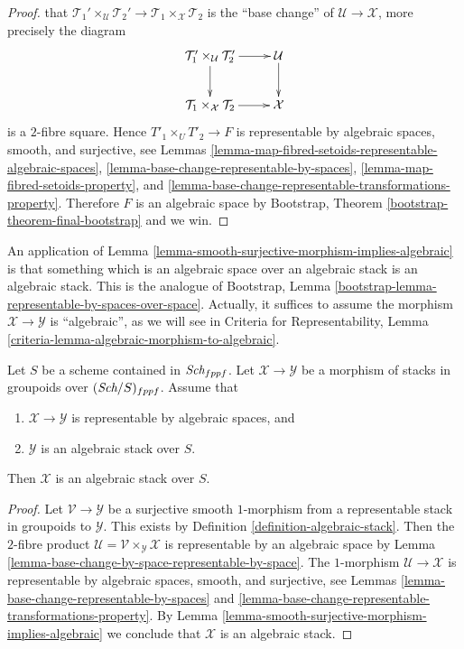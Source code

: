 \begin{proof}
that $\mathcal{T}_1' \times_\mathcal{U} \mathcal{T}_2' \to 
\mathcal{T}_1 \times_{\mathcal X} \mathcal{T}_2$
is the ``base change'' of $\mathcal{U} \to \mathcal{X}$, more precisely
the diagram
$$
\xymatrix{
\mathcal{T}_1' \times_\mathcal{U} \mathcal{T}_2' \ar[d] \ar[r] &
\mathcal{U} \ar[d] \\
\mathcal{T}_1 \times_{\mathcal X} \mathcal{T}_2 \ar[r] &
\mathcal{X}
}
$$
is a $2$-fibre square.
Hence $T'_1 \times_U T'_2 \to F$ is representable by algebraic spaces,
smooth, and surjective, see
Lemmas \ref{lemma-map-fibred-setoids-representable-algebraic-spaces},
\ref{lemma-base-change-representable-by-spaces},
\ref{lemma-map-fibred-setoids-property}, and
\ref{lemma-base-change-representable-transformations-property}.
Therefore $F$ is an algebraic space by
Bootstrap, Theorem \ref{bootstrap-theorem-final-bootstrap}
and we win.
\end{proof}

\noindent
An application of
Lemma \ref{lemma-smooth-surjective-morphism-implies-algebraic}
is that something which is an algebraic space over an algebraic stack
is an algebraic stack. This is the analogue of
Bootstrap, Lemma \ref{bootstrap-lemma-representable-by-spaces-over-space}.
Actually, it suffices to assume the morphism
$\mathcal{X} \to \mathcal{Y}$ is ``algebraic'', as we will see in
Criteria for Representability,
Lemma \ref{criteria-lemma-algebraic-morphism-to-algebraic}.

\begin{lemma}
\label{lemma-representable-morphism-to-algebraic} 
Let $S$ be a scheme contained in $\textit{Sch}_{fppf}$. 
Let $\mathcal{X} \to \mathcal{Y}$ be a morphism of stacks in groupoids
over $(\textit{Sch}/S)_{fppf}$. Assume that
\begin{enumerate}
\item $\mathcal{X} \to \mathcal{Y}$ is representable by algebraic spaces, and
\item $\mathcal{Y}$ is an algebraic stack over $S$.
\end{enumerate}
Then $\mathcal{X}$ is an algebraic stack over $S$.
\end{lemma}

\begin{proof}
Let $\mathcal{V} \to \mathcal{Y}$ be a surjective smooth $1$-morphism
from a representable stack in groupoids to $\mathcal{Y}$. This exists by
Definition \ref{definition-algebraic-stack}.
Then the $2$-fibre product
$\mathcal{U} = \mathcal{V} \times_{\mathcal Y} \mathcal X$
is representable by an algebraic space by
Lemma \ref{lemma-base-change-by-space-representable-by-space}.
The $1$-morphism $\mathcal{U} \to \mathcal X$ is representable by algebraic
spaces, smooth, and surjective, see
Lemmas \ref{lemma-base-change-representable-by-spaces} and
\ref{lemma-base-change-representable-transformations-property}.
By
Lemma \ref{lemma-smooth-surjective-morphism-implies-algebraic}
we conclude that $\mathcal{X}$ is an algebraic stack.  
\end{proof}

